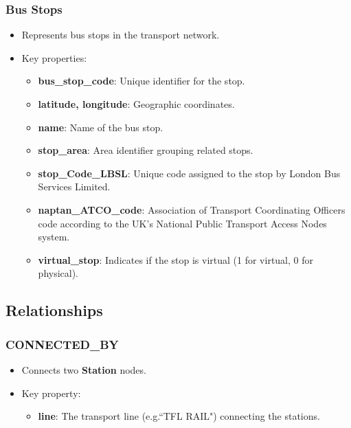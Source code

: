 \documentclass{Configuration_Files/PoliMi3i_thesis}
\begin{document}
\subsubsection*{Bus Stops}
\begin{itemize}
    \item Represents bus stops in the transport network.
    \item Key properties:
          \begin{itemize}
              \item \textbf{bus\_stop\_code}: Unique identifier for the stop.
              \item \textbf{latitude, longitude}: Geographic coordinates.
              \item \textbf{name}: Name of the bus stop.
              \item \textbf{stop\_area}: Area identifier grouping related stops.
              \item \textbf{stop\_Code\_LBSL}: Unique code assigned to the stop by London Bus Services Limited.
              \item \textbf{naptan\_ATCO\_code}: Association of Transport Coordinating Officers code according to the UK’s National Public Transport Access Nodes system.
              \item \textbf{virtual\_stop}: Indicates if the stop is virtual (1 for virtual, 0 for physical).
          \end{itemize}
\end{itemize}

\subsection*{Relationships}
\subsubsection*{\textbf{CONNECTED\_BY}}
\begin{itemize}
    \item Connects two \textbf{Station} nodes.
    \item Key property:
          \begin{itemize}
              \item \textbf{line}: The transport line (e.g.``TFL RAIL") connecting the stations.
          \end{itemize}
\end{itemize}
\end{document}

